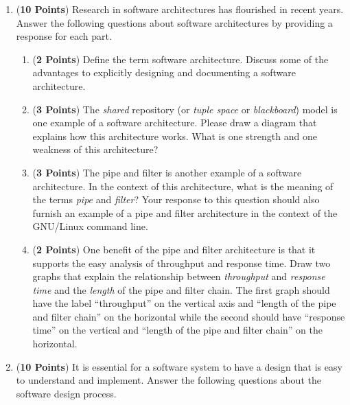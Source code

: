 \begin{enumerate}
\begin{enumerate}
\end{enumerate}

\newpage

\item ({\bf 10 Points}) Research in software architectures has
  flourished in recent years.  Answer the following questions about
  software architectures by providing a response for each part.

\begin{enumerate}

\item ({\bf 2 Points}) Define the term software architecture.  Discuss
  some of the advantages to explicitly designing and documenting a
  software architecture.

\item ({\bf 3 Points}) The {\em shared} repository (or {\em tuple
  space} or {\em blackboard}) model is one example of a software
  architecture.  Please draw a diagram that explains how this
  architecture works.  What is one strength and one weakness of this
  architecture?

\item ({\bf 3 Points}) The pipe and filter is another example of a
  software architecture.  In the context of this architecture, what is
  the meaning of the terms {\em pipe} and {\em filter}?  Your response
  to this question should also furnish an example of a pipe and filter
  architecture in the context of the GNU/Linux command line.

\item ({\bf 2 Points}) One benefit of the pipe and filter architecture
  is that it supports the easy analysis of throughput and response
  time.  Draw two graphs that explain the relationship between {\em
    throughput} and {\em response time} and the {\em length} of the
  pipe and filter chain.  The first graph should have the label
  ``throughput'' on the vertical axis and ``length of the pipe and
  filter chain'' on the horizontal while the second should have
  ``response time'' on the vertical and ``length of the pipe and
  filter chain'' on the horizontal.

\end{enumerate}

\newpage

\item ({\bf 10 Points}) It is essential for a software system to have
  a design that is easy to understand and implement.  Answer the
  following questions about the software design process.


\end{enumerate}

